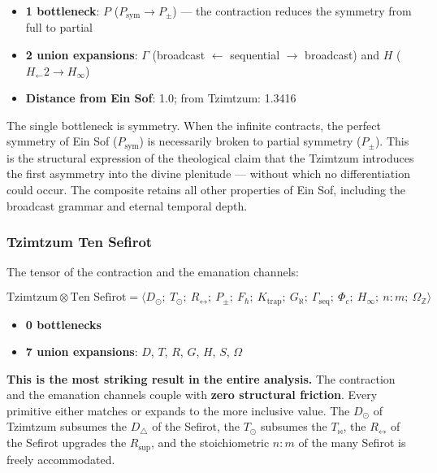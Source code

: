 \documentclass[12pt,a4paper]{article}
\begin{document}
\begin{itemize}
    \item \textbf{1 bottleneck}: $P$ ($P_\text{sym} \to P_{\pm}$) --- the contraction reduces the symmetry from full to partial
    \item \textbf{2 union expansions}: $\Gamma$ (broadcast $\leftarrow$ sequential $\rightarrow$ broadcast) and $H$ ($H_{\leftarrow}\text{2} \to H_{\infty}$)
    \item \textbf{Distance from Ein Sof}: 1.0; from Tzimtzum: 1.3416
\end{itemize}

The single bottleneck is symmetry. When the infinite contracts, the perfect symmetry of Ein Sof ($P_\text{sym}$) is necessarily broken to partial symmetry ($P_{\pm}$). This is the structural expression of the theological claim that the Tzimtzum introduces the first asymmetry into the divine plenitude --- without which no differentiation could occur. The composite retains all other properties of Ein Sof, including the broadcast grammar and eternal temporal depth.

\subsubsection{Tzimtzum \otimes Ten Sefirot}

The tensor of the contraction and the emanation channels:

\[\text{Tzimtzum} \otimes \text{Ten Sefirot} = \langle D_{\odot};\ T_{\odot};\ R_{\leftrightarrow};\ P_{\pm};\ F_{\hbar};\ K_\text{trap};\ G_{\aleph};\ \Gamma_\text{seq};\ \Phi_c;\ H_{\infty};\ n{:}m;\ \Omega_\mathbb{Z} \rangle\]

\begin{itemize}
    \item \textbf{0 bottlenecks}
    \item \textbf{7 union expansions}: $D$, $T$, $R$, $G$, $H$, $S$, $\Omega$
\end{itemize}

\textbf{This is the most striking result in the entire analysis.} The contraction and the emanation channels couple with \textbf{zero structural friction}. Every primitive either matches or expands to the more inclusive value. The $D_{\odot}$ of Tzimtzum subsumes the $D_{\triangle}$ of the Sefirot, the $T_{\odot}$ subsumes the $T_{\bowtie}$, the $R_{\leftrightarrow}$ of the Sefirot upgrades the $R_\text{sup}$, and the stoichiometric $n{:}m$ of the many Sefirot is freely accommodated.
\end{document}

